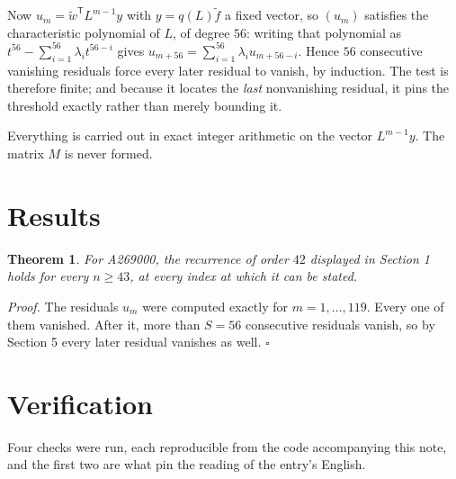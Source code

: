 \documentclass[11pt]{article}
\newtheorem{theorem}{Theorem}
\theoremstyle{definition}
\begin{document}
Now $u_m = \tilde w^{\mathsf T} L^{m-1} y$ with $y = q(L)\tilde f$ a fixed vector, so $(u_m)$ satisfies the characteristic polynomial of $L$, of degree $56$: writing that polynomial as $t^{56} - \sum_{i=1}^{56} \lambda_i t^{56-i}$ gives $u_{m+56} = \sum_{i=1}^{56} \lambda_i u_{m+56-i}$. Hence $56$ consecutive vanishing residuals force every later residual to vanish, by induction. The test is therefore finite; and because it locates the {\itshape last} nonvanishing residual, it pins the threshold exactly rather than merely bounding it.

Everything is carried out in exact integer arithmetic on the vector $L^{m-1}y$. The matrix $M$ is never formed.

\section{Results}

\begin{theorem} For A269000, the recurrence of order $42$ displayed in Section 1 holds for every $n \ge 43$, at every index at which it can be stated.\end{theorem}

{\itshape Proof.} The residuals $u_m$ were computed exactly for $m = 1,\dots,119$. Every one of them vanished. After it, more than $S = 56$ consecutive residuals vanish, so by Section 5 every later residual vanishes as well. $\square$

\section{Verification}

Four checks were run, each reproducible from the code accompanying this note, and the first two are what pin the reading of the entry's English.
\end{document}
